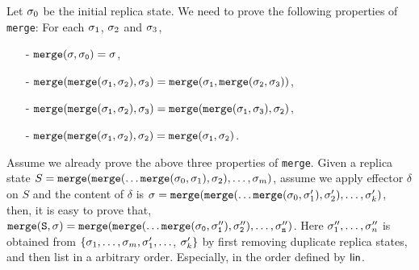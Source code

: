 
Let $\sigma_0$ be the initial replica state. We need to prove the following properties of {\tt merge}: For each $\sigma_1$, $\sigma_2$ and $\sigma_3$,

\begin{itemize}
\setlength{\itemsep}{0.5pt}
\item[-] $\alabelshort[{\tt merge}]{\astate,\astate_0} = \astate$,

\item[-] $\alabelshort[{\tt merge}]{\alabelshort[{\tt merge}]{\astate_1,\astate_2},\astate_3} = \alabelshort[{\tt merge}]{\astate_1, \alabelshort[{\tt merge}]{\astate_2,\astate_3}}$,

\item[-] $\alabelshort[{\tt merge}]{\alabelshort[{\tt merge}]{\astate_1,\astate_2},\astate_3} = \alabelshort[{\tt merge}]{\alabelshort[{\tt merge}]{\astate_1,\astate_3},\astate_2}$,

\item[-] $\alabelshort[{\tt merge}]{\alabelshort[{\tt merge}]{\astate_1,\astate_2},\astate_2} = \alabelshort[{\tt merge}]{\astate_1,\astate_2}$.
\end{itemize}





Assume we already prove the above three properties of {\tt merge}. Given a replica state $S = {\tt merge}( {\tt merge}( \ldots {\tt merge} (\sigma_0,\sigma_1),\sigma_2),\ldots,\sigma_m )$, assume we apply effector $\delta$ on $S$ and the content of $\delta$ is $\sigma = {\tt merge}( {\tt merge}( \ldots {\tt merge} (\sigma_0,\sigma'_1),\sigma'_2),\ldots,\sigma'_k )$, then, it is easy to prove that, $\alabelshort[{\tt merge}]{S,\astate} = {\tt merge}( {\tt merge}( \ldots {\tt merge} (\astate_0,\astate''_1),\astate''_2),\ldots,\astate''_n)$. Here $\sigma''_1,\ldots,\sigma''_n$ is obtained from $\{ \sigma_1,\ldots,\sigma_m,\sigma'_1,\ldots$, $\sigma'_k \}$ by first removing duplicate replica states, and then list in a arbitrary order. Especially, in the order defined by $\mathsf{lin}$.

